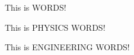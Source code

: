 \documentclass[a4paper,9pt]{extarticle}
\begin{document}
This is WORDS!

This is PHYSICS WORDS!

This is ENGINEERING WORDS!

\end{document}
